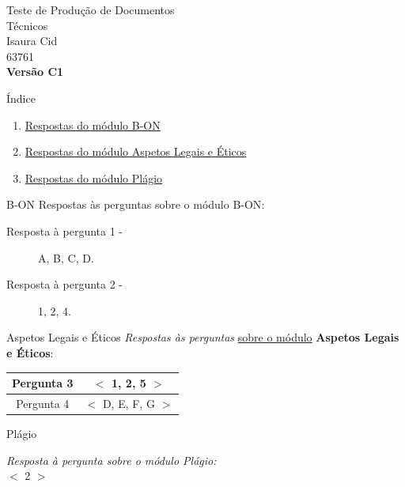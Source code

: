 \documentclass[11pt]{beamer}
\date{}
\author{Versão \textbf{C1}}
\begin{document}
\begin{frame}
\begin{center}
\huge{Teste de Produção de Documentos \\ Técnicos}
\vspace{0.5cm} \\
\normalsize{Isaura Cid \\ 63761} \\
\vspace{0.1cm}
\textbf{Versão C1}
\end{center}
\end{frame}

\begin{frame}{Índice}
\begin{enumerate}
\item \hyperlink{B-ON}{Respostas do módulo B-ON} \vspace{0.5cm}
\item \hyperlink{Aspetos Legais e Éticos}{Respostas do módulo Aspetos Legais e Éticos} \vspace{0.5cm}
\item \hyperlink{Plágio}{Respostas do módulo Plágio}
\end{enumerate}
\end{frame}

\begin{frame}{B-ON}
\label{B-ON}
\tiny{Respostas} \normalsize{às perguntas} \Large{sobre o módulo} \Huge{B-ON}\normalsize{:} \\ \vspace{0.5cm}
\begin{description}
\item[Resposta à pergunta 1 -] A, B, C, D.
\item[Resposta à pergunta 2 -] 1, 2, 4.
\end{description}
\end{frame}

\begin{frame}{Aspetos Legais e Éticos}
\label{Aspetos Legais e Éticos}
\textit{Respostas às perguntas} \underline{sobre o módulo} \textbf{Aspetos Legais e Éticos}: \vspace{0.7cm}
\begin{table}[h!]
\begin{tabular}{c | c} 
Pergunta 3 & $<$ 1, 2, 5 $>$ \\ \hline
Pergunta 4 & $<$ D, E, F, G $>$ 
\end{tabular}
\end{table}
\end{frame}

\begin{frame}{Plágio}
\label{Plágio}
\begin{flushright}
\textit{Resposta à pergunta sobre o módulo Plágio:} \\ \vspace{0.5cm}
$<$ 2 $>$
\end{flushright}
\end{frame}
\end{document}
